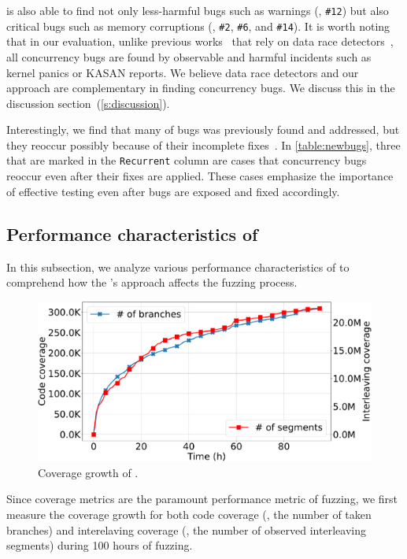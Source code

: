 \sys is also able to find not only less-harmful bugs such as warnings
(\eg, \texttt{\#12}) but also critical bugs such as memory corruptions
(\eg, \texttt{\#2}, \texttt{\#6}, and \texttt{\#14}).
%
It is worth noting that in our evaluation, unlike previous
works~\cite{snowboard, krace} that rely on data race
detectors~\cite{kcsan, tsan}, all concurrency bugs are found by
observable and harmful incidents such as kernel panics or KASAN
reports.
%
\dr{}
We believe data race detectors and our approach are complementary in
finding concurrency bugs. We discuss this in the discussion
section~(\autoref{s:discussion}).

Interestingly, we find that many of bugs was previously found and
addressed, but they reoccur possibly because of their incomplete
fixes~\cite{learningfrommistakes}.
%
In \autoref{table:newbugs}, three that are marked in the
\texttt{Recurrent} column are cases that concurrency bugs reoccur even
after their fixes are applied.
%
These cases emphasize the importance of effective testing even after
bugs are exposed and fixed accordingly.






\subsection{Performance characteristics of \sys}
\label{ss:characteristics}

In this subsection, we analyze various performance characteristics of
\sys to comprehend how the \sys's approach affects the fuzzing
process.

%
\begin{figure}[t]
  \centering
  \includegraphics[width=\linewidth]{fig/coverage_graph-crop.pdf}
  \caption{Coverage growth of \sys.}
  \label{fig:eval:coverage}
\end{figure}
%
Since coverage metrics are the paramount performance metric of
fuzzing, we first measure the coverage growth for both code coverage
(\ie, the number of taken branches) and interelaving coverage (\ie,
the number of observed interleaving segments) during 100 hours of
fuzzing.

